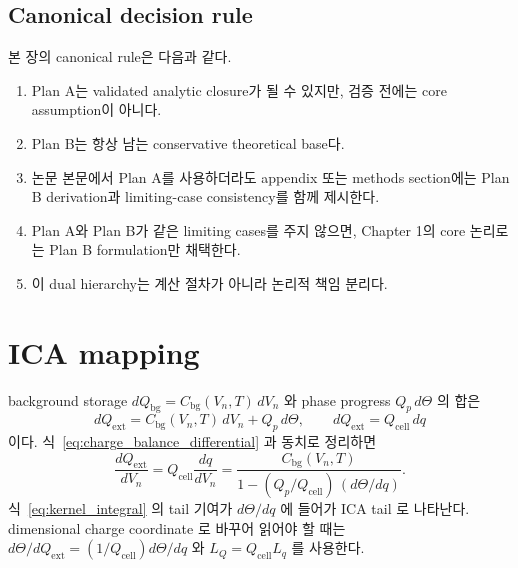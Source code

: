 \documentclass[11pt,a4paper]{article}
\newcommand{\bg}{\mathrm{bg}}
\newcommand{\cell}{\mathrm{cell}}
\newcommand{\ext}{\mathrm{ext}}
\begin{document}
\subsection{Canonical decision rule}\label{sec:closure_decision}
본 장의 canonical rule은 다음과 같다.
\begin{enumerate}[label=\textbf{R\arabic*.}]
\item Plan A는 validated analytic closure가 될 수 있지만, 검증 전에는 core assumption이 아니다.
\item Plan B는 항상 남는 conservative theoretical base다.
\item 논문 본문에서 Plan A를 사용하더라도 appendix 또는 methods section에는 Plan B derivation과
  limiting-case consistency를 함께 제시한다.
\item Plan A와 Plan B가 같은 limiting cases를 주지 않으면, Chapter 1의 core 논리로는 Plan B
  formulation만 채택한다.
\item 이 dual hierarchy는 계산 절차가 아니라 논리적 책임 분리다.
\end{enumerate}
\section{ICA mapping}\label{sec:ica}
background storage $dQ_\bg=C_\bg(V_n,T)\,dV_n$ 와 phase progress $Q_p\,d\Theta$ 의 합은
\[
dQ_\ext=C_\bg(V_n,T)\,dV_n+Q_p\,d\Theta,
\qquad dQ_\ext=Q_\cell\,dq
\]
이다. 식~\eqref{eq:charge_balance_differential} 과 동치로 정리하면
\begin{equation}
\boxed{\;\frac{dQ_\ext}{dV_n}=Q_\cell\frac{dq}{dV_n}
=
\frac{C_\bg(V_n,T)}
{1-(Q_p/Q_\cell)\,(d\Theta/dq)}.\;}
\label{eq:ica}
\end{equation}
식~\eqref{eq:kernel_integral} 의 tail 기여가 $d\Theta/dq$ 에 들어가 ICA tail 로 나타난다.
dimensional charge coordinate 로 바꾸어 읽어야 할 때는 $d\Theta/dQ_\ext=(1/Q_\cell)d\Theta/dq$ 와
$L_Q=Q_\cell L_q$ 를 사용한다.
\end{document}
